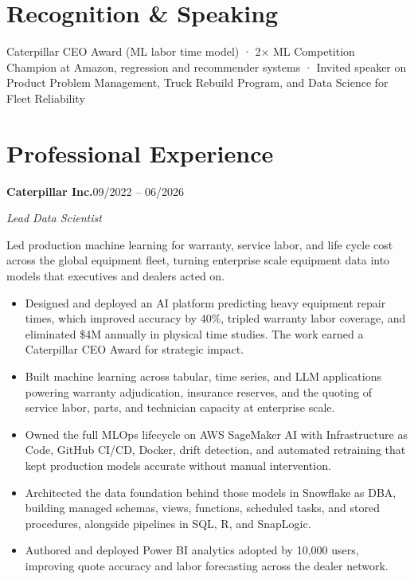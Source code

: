 \documentclass[10pt]{article}
\newcommand{\companyentry}[3]{%
  \smallskip\textbf{#1}\hspace{0.4em}{\color{slate}\small #2}\hfill{\color{slate}\small #3}\par}
\newcommand{\role}[1]{\textit{#1}\par\vspace{1pt}}
\begin{document}
\section{Recognition \& Speaking}
Caterpillar CEO Award (ML labor time model) · 2× ML Competition Champion at Amazon, regression and recommender systems · Invited speaker on Product Problem Management, Truck Rebuild Program, and Data Science for Fleet Reliability

\section{Professional Experience}

\companyentry{Caterpillar Inc.}{Peoria, IL}{09/2022 -- 06/2026}
\role{Lead Data Scientist}
Led production machine learning for warranty, service labor, and life cycle cost across the global equipment fleet, turning enterprise scale equipment data into models that executives and dealers acted on.
    \begin{itemize}
        \item Designed and deployed an AI platform predicting heavy equipment repair times, which improved accuracy by 40\%, tripled warranty labor coverage, and eliminated \$4M annually in physical time studies. The work earned a Caterpillar CEO Award for strategic impact.
        \item Built machine learning across tabular, time series, and LLM applications powering warranty adjudication, insurance reserves, and the quoting of service labor, parts, and technician capacity at enterprise scale.
        \item Owned the full MLOps lifecycle on AWS SageMaker AI with Infrastructure as Code, GitHub CI/CD, Docker, drift detection, and automated retraining that kept production models accurate without manual intervention.
        \item Architected the data foundation behind those models in Snowflake as DBA, building managed schemas, views, functions, scheduled tasks, and stored procedures, alongside pipelines in SQL, R, and SnapLogic.
        \item Authored and deployed Power BI analytics adopted by 10,000 users, improving quote accuracy and labor forecasting across the dealer network.
    \end{itemize}
\end{document}
